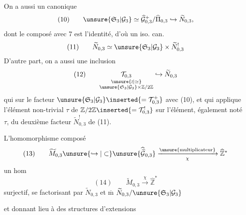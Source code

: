 On a aussi un  canonique
\[
(10)\qquad\unsure{\mathfrak S_3|\mathcal G_3}\simeq\widehat{\mathcal G}_{0,3}^{+}/\widehat{\Pi}_{0,3}\hookrightarrow\widetilde N_{0,3},
\]
dont le composé avec 7 est l'identité, d'où un iso. can.
\[
(11)\qquad\widetilde N_{0,3}\simeq\unsure{\mathfrak S_3|\mathcal G_3}\times\widetilde N_{0,3}^{!}
\]
D'autre part, on a aussi une inclusion
\[
(12)\qquad
\underset{\substack{\unsure{\wr|\simeq}\\\unsure{\mathfrak S_3|\mathcal G_3}\times\mathbb Z/2\mathbb Z}}{\mathcal T_{0,3}}
\hookrightarrow\widetilde N_{0,3}
\]
qui sur le facteur $\unsure{\mathfrak S_3|\mathcal G_3}\inserted{=\mathcal T_{0,3}^{+}}$  avec (10), et qui  applique l'élément non-trivial $\tau$ de $\mathbb Z/2\mathbb Z\inserted{=\mathcal T_{0,3}^{!}}$ sur l'élément, également noté $\tau$, du deuxième facteur $\widetilde N_{0,3}^{!}$ de (11).


L'homomorphisme composé
\[
(13)\qquad \widetilde M_{0,3}\unsure{\hookrightarrow|\subset}
\unsure{\widehat{\widehat{\mathcal G}}_{0,3}}
\xrightarrow[\chi]{\text{\unsure{multiplicateur}}}
\widehat{\mathbb Z}^{*}
\]
 un hom
\[
(14)\qquad \widetilde M_{0,3}\xrightarrow{\chi}\widehat{\mathbb Z}^{*}
\]
surjectif, se factorisant par $\widetilde N_{0,3}$ et $\overline{\mathrm m}$  $\widetilde N_{0,3}/\unsure{\mathfrak S_3|\mathcal G_3}$


et donnant lieu à des structures d'extensions


